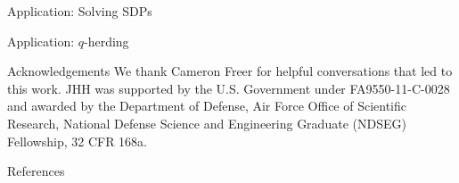 \documentclass[final]{beamer}
\begin{document}
\begin{frame}{}
\begin{columns}
\begin{column}{0.48\linewidth}
\begin{block}{\large Application: Solving SDPs}


\end{block}

\begin{block}{\large Application: $q$-herding}


\end{block}

\begin{block}{\large Acknowledgements}
We thank Cameron Freer for helpful conversations that led to this work. JHH was supported by the U.S. Government under FA9550-11-C-0028 and awarded by the Department of Defense, Air Force Office of Scientific Research, National Defense Science and Engineering Graduate (NDSEG) Fellowship, 32 CFR 168a.
\end{block}

\begin{block}{\small References}
\begin{footnotesize}


\end{footnotesize}
\end{block}


\end{column}

\end{columns}
\end{frame}
\end{document}
